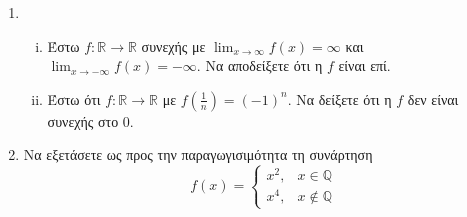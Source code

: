 \begin{enumerate}
    \item 
        \begin{enumerate}[i)]
            \item Έστω $ f \colon \mathbb{R} \to \mathbb{R} $ συνεχής με 
                $ \lim_{x \to \infty} f(x) = \infty$ και $ \lim_{x \to - \infty} f(x) 
                = - \infty $. Να αποδείξετε ότι η $f$ είναι επί.

            \item Έστω ότι $ f \colon \mathbb{R} \to \mathbb{R} $ με $ f(\frac{1}{n}) 
                = (-1)^{n} $. Να δείξετε ότι η $f$ δεν είναι συνεχής στο 0.
        \end{enumerate}

    \item Να εξετάσετε ως προς την παραγωγισιμότητα τη συνάρτηση
        \[
            f(x) = 
            \begin{cases} 
                x^{2}, & x \in \mathbb{Q} \\ 
                x^{4}, & x \not \in \mathbb{Q} 
            \end{cases} 
         \] 
\end{enumerate}

